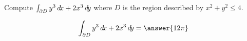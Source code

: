 \documentclass{ximera}
\author{David Guichard \and Neal Koblitz \and H. Jerome Keisler \and Albert Scheller \and Barry Balof \and Mike Wills \and Matthew Carr}
\begin{document}
\begin{exercise}




Compute $\int_{\partial D}y^3 \mathop{}\!d\! x+2x^3\mathop{}\!d\! y$ where $D$ is the region described by $x^2+y^2\le 4$. 

\begin{prompt}
\[
\int_{\partial D}y^3\d x+2x^3\d y=\answer{12\pi}
\]
\end{prompt}

\end{exercise}
\end{document}
